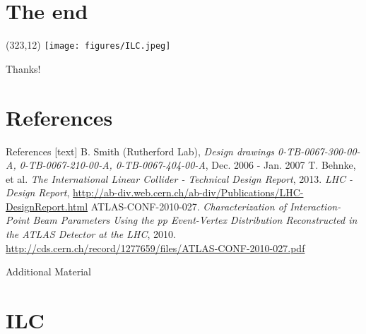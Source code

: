 \documentclass[xcolor={dvipsnames}]{beamer}
\newcommand{\ilclogo}{
  \setlength{\TPHorizModule}{1pt}
  \setlength{\TPVertModule}{1pt}
  \begin{textblock}{1}(323,12)
   \texttt{[image: figures/ILC.jpeg]}
  \end{textblock}
}
\begin{document}
\section*{The end}
{
\begin{frame}
\ilclogo
\begin{center}
\textcolor{RubineRed}{
	\LARGE Thanks!\\
}
\end{center}
\end{frame}
}

\section*{References}
\begin{thebibliography}{9}
\begin{frame}{References}
[text]
 B. Smith (Rutherford Lab), \emph{Design drawings 0-TB-0067-300-00-A, 0-TB-0067-210-00-A, 0-TB-0067-404-00-A}, Dec. 2006 - Jan. 2007
 T. Behnke, et al.
\emph{The International Linear Collider - Technical Design Report}, 2013.
 \emph{LHC - Design Report}, \url{http://ab-div.web.cern.ch/ab-div/Publications/LHC-DesignReport.html}
 ATLAS-CONF-2010-027. \emph{Characterization of Interaction-Point Beam Parameters Using the pp Event-Vertex Distribution Reconstructed in the ATLAS Detector at the LHC}, 2010. \url{http://cds.cern.ch/record/1277659/files/ATLAS-CONF-2010-027.pdf}
\end{frame}
\end{thebibliography}

\appendix

\begin{frame}
\begin{center}
\LARGE Additional Material
\end{center}
  \tableofcontents
\end{frame}

\section{ILC}

\end{document}
